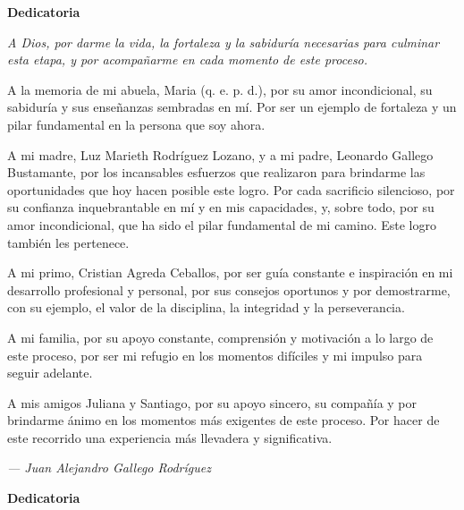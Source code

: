 \cleardoublepage%
%
\thispagestyle{empty}


\begin{center}
	{\Large\bfseries Dedicatoria}
\end{center}


\begin{center}
	 {\itshape
    A Dios, por darme la vida, la fortaleza y la sabiduría necesarias para culminar esta etapa, y por acompañarme en cada momento de este proceso.

	A la memoria de mi abuela, Maria (q. e. p. d.), por su amor incondicional, su sabiduría y sus enseñanzas sembradas en mí. Por ser un ejemplo de fortaleza y un pilar fundamental en la persona que soy ahora.

    A mi madre, Luz Marieth Rodríguez Lozano, y a mi padre, Leonardo Gallego Bustamante, por los incansables esfuerzos que realizaron para brindarme las oportunidades que hoy hacen posible este logro. Por cada sacrificio silencioso, por su confianza inquebrantable en mí y en mis capacidades, y, sobre todo, por su amor incondicional, que ha sido el pilar fundamental de mi camino. Este logro también les pertenece.

    A mi primo, Cristian Agreda Ceballos, por ser guía constante e inspiración en mi desarrollo profesional y personal, por sus consejos oportunos y por demostrarme, con su ejemplo, el valor de la disciplina, la integridad y la perseverancia.

    A mi familia, por su apoyo constante, comprensión y motivación a lo largo de este proceso, por ser mi refugio en los momentos difíciles y mi impulso para seguir adelante.
    
	A mis amigos Juliana y Santiago, por su apoyo sincero, su compañía y por brindarme ánimo en los momentos más exigentes de este proceso. Por hacer de este recorrido una experiencia más llevadera y significativa.

	}
	\vspace{1cm}

	\hfill \textit{--- Juan Alejandro Gallego Rodríguez}
\end{center}

	\clearpage

\begin{center}
	{\Large\bfseries Dedicatoria}
\end{center}

